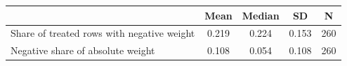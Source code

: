 \begin{tabular}{lcccc}
\toprule
 & Mean & Median & SD & N \\
\midrule
Share of treated rows with negative weight & 0.219 & 0.224 & 0.153 & 260 \\
Negative share of absolute weight & 0.108 & 0.054 & 0.108 & 260 \\
\bottomrule
\end{tabular}
